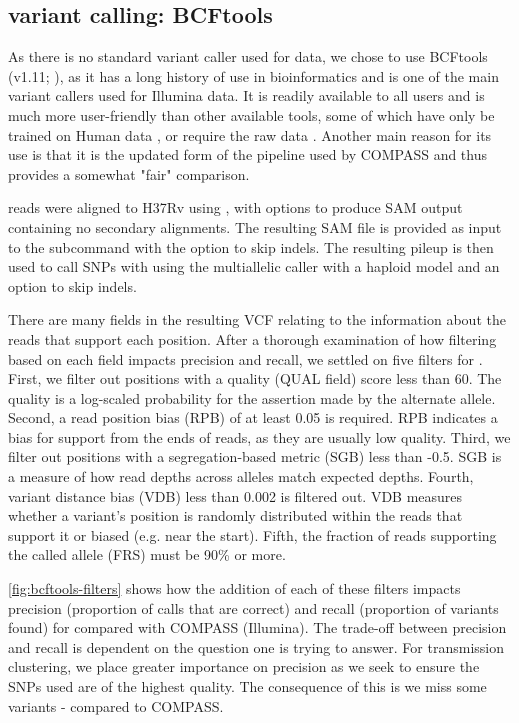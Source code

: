 \subsection{\ont{} variant calling: BCFtools}
\label{sec:bcftools-filters}

As there is no standard variant caller used for \mtb{} \ont{} data, we chose to use BCFtools (v1.11; \cite{bcftools2021}), as it has a long history of use in bioinformatics and is one of the main variant callers used for Illumina data. It is readily available to all users and is much more user-friendly than other available tools, some of which have only be trained on Human data \cite{clair2020}, or require the raw \ont{} data \cite{nanopolish2015}. Another main reason for its use is that it is the updated form of the  pipeline used by COMPASS and thus provides a somewhat "fair" comparison.

\ont{} reads were aligned to H37Rv using , with options to produce SAM output containing no secondary alignments. The resulting SAM file is provided as input to the \bcftools{} subcommand  with the option to skip indels. The resulting pileup is then used to call SNPs with  using the multiallelic caller with a haploid model and an option to skip indels.

There are many fields in the resulting VCF relating to the information about the reads that support each position. After a thorough examination of how filtering based on each field impacts precision and recall, we settled on five filters for \bcftools{}. First, we filter out positions with a quality (QUAL field) score less than 60. The quality is a log-scaled probability for the assertion made by the alternate allele. Second, a read position bias (RPB) of at least 0.05 is required. RPB indicates a bias for support from the ends of reads, as they are usually low quality. Third, we filter out positions with a segregation-based metric (SGB) less than -0.5. SGB is a measure of how read depths across alleles match expected depths. Fourth, variant distance bias (VDB) less than 0.002 is filtered out. VDB measures whether a variant's position is randomly distributed within the reads that support it or biased (e.g. near the start). Fifth, the fraction of reads supporting the called allele (FRS) must be 90\% or more.

\autoref{fig:bcftools-filters} shows how the addition of each of these filters impacts precision (proportion of calls that are correct) and recall (proportion of variants found) for \bcftools{} compared with COMPASS (Illumina). The trade-off between precision and recall is dependent on the question one is trying to answer. For transmission clustering, we place greater importance on precision as we seek to ensure the SNPs used are of the highest quality. The consequence of this is we miss some variants - compared to COMPASS.

